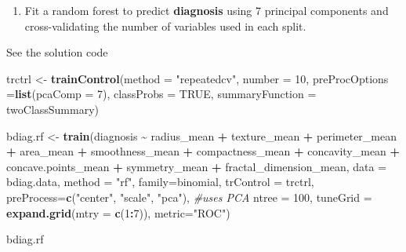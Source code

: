 \documentclass[
]{book}
\newenvironment{Shaded}{\begin{snugshade}}{\end{snugshade}}
\newcommand{\AttributeTok}[1]{\textcolor[rgb]{0.13,0.29,0.53}{#1}}
\newcommand{\CommentTok}[1]{\textcolor[rgb]{0.56,0.35,0.01}{\textit{#1}}}
\newcommand{\ConstantTok}[1]{\textcolor[rgb]{0.56,0.35,0.01}{#1}}
\newcommand{\DecValTok}[1]{\textcolor[rgb]{0.00,0.00,0.81}{#1}}
\newcommand{\FunctionTok}[1]{\textcolor[rgb]{0.13,0.29,0.53}{\textbf{#1}}}
\newcommand{\NormalTok}[1]{#1}
\newcommand{\OtherTok}[1]{\textcolor[rgb]{0.56,0.35,0.01}{#1}}
\newcommand{\SpecialCharTok}[1]{\textcolor[rgb]{0.81,0.36,0.00}{\textbf{#1}}}
\newcommand{\StringTok}[1]{\textcolor[rgb]{0.31,0.60,0.02}{#1}}
\providecommand{\tightlist}{%
  \setlength{\itemsep}{0pt}\setlength{\parskip}{0pt}}
\begin{document}
\begin{enumerate}
\def\labelenumi{\arabic{enumi})}
\tightlist
\item
  Fit a random forest to predict \textbf{diagnosis} using 7 principal components and
  cross-validating the number of variables used in each split.
\end{enumerate}

See the solution code

\begin{Shaded}
\begin{Highlighting}[]
\NormalTok{trctrl }\OtherTok{\textless{}{-}} \FunctionTok{trainControl}\NormalTok{(}\AttributeTok{method =} \StringTok{"repeatedcv"}\NormalTok{, }
                       \AttributeTok{number =} \DecValTok{10}\NormalTok{,}
                       \AttributeTok{preProcOptions =}\FunctionTok{list}\NormalTok{(}\AttributeTok{pcaComp =} \DecValTok{7}\NormalTok{), }
                       \AttributeTok{classProbs =} \ConstantTok{TRUE}\NormalTok{,  }
                       \AttributeTok{summaryFunction =}\NormalTok{ twoClassSummary)}

\NormalTok{bdiag.rf }\OtherTok{\textless{}{-}} \FunctionTok{train}\NormalTok{(diagnosis }\SpecialCharTok{\textasciitilde{}}\NormalTok{ radius\_mean }\SpecialCharTok{+}\NormalTok{ texture\_mean }\SpecialCharTok{+} 
\NormalTok{                     perimeter\_mean }\SpecialCharTok{+}\NormalTok{ area\_mean }\SpecialCharTok{+} 
\NormalTok{                     smoothness\_mean }\SpecialCharTok{+}\NormalTok{ compactness\_mean }\SpecialCharTok{+} 
\NormalTok{                     concavity\_mean }\SpecialCharTok{+}\NormalTok{ concave.points\_mean }\SpecialCharTok{+} 
\NormalTok{                     symmetry\_mean }\SpecialCharTok{+}\NormalTok{ fractal\_dimension\_mean,}
                   \AttributeTok{data =}\NormalTok{ bdiag.data,}
                   \AttributeTok{method =} \StringTok{"rf"}\NormalTok{,}
                   \AttributeTok{family=}\NormalTok{binomial,}
                   \AttributeTok{trControl =}\NormalTok{ trctrl,}
                   \AttributeTok{preProcess=}\FunctionTok{c}\NormalTok{(}\StringTok{"center"}\NormalTok{, }\StringTok{"scale"}\NormalTok{, }\StringTok{"pca"}\NormalTok{), }\CommentTok{\#uses PCA}
                   \AttributeTok{ntree =} \DecValTok{100}\NormalTok{,}
                   \AttributeTok{tuneGrid =} \FunctionTok{expand.grid}\NormalTok{(}\AttributeTok{mtry =} \FunctionTok{c}\NormalTok{(}\DecValTok{1}\SpecialCharTok{:}\DecValTok{7}\NormalTok{)),  }
                   \AttributeTok{metric=}\StringTok{"ROC"}\NormalTok{)}

\NormalTok{bdiag.rf}
\end{Highlighting}
\end{Shaded}
\end{document}
